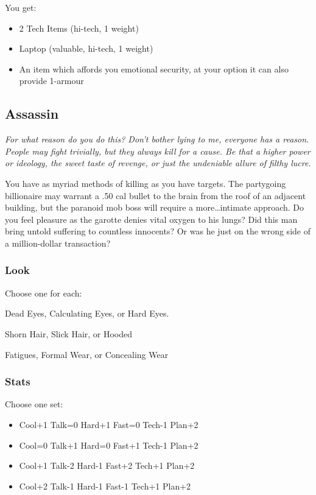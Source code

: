 You get:
\begin{itemize}
\item 2 Tech Items (hi-tech, 1 weight)
\item Laptop (valuable, hi-tech, 1 weight)
\item An item which affords you emotional security, at your option it can also provide 1-armour
\end{itemize}



\subsection{Assassin}
{\itshape For what reason do you do this? Don't bother lying to me, everyone has a reason. People may fight trivially, but they always kill for a cause. Be that a higher power or ideology, the sweet taste of revenge, or just the undeniable allure of filthy lucre.

You have as myriad methods of killing as you have targets. The partygoing billionaire may warrant a .50 cal bullet to the brain from the roof of an adjacent building, but the paranoid mob boss will require a more\ldots intimate approach. Do you feel pleasure as the garotte denies vital oxygen to his lungs? Did this man bring untold suffering to countless innocents? Or was he just on the wrong side of a million-dollar transaction?}

\subsubsection{Look}
Choose one for each:

Dead Eyes, Calculating Eyes, or Hard Eyes.

Shorn Hair, Slick Hair, or Hooded

Fatigues, Formal Wear, or Concealing Wear

\subsubsection{Stats}
Choose one set:
\begin{itemize}
\setlength\itemsep{0em}
\item Cool+1 Talk=0 Hard+1 Fast=0 Tech-1 Plan+2
\item Cool=0 Talk+1 Hard=0 Fast+1 Tech-1 Plan+2
\item Cool+1 Talk-2 Hard-1 Fast+2 Tech+1 Plan+2
\item Cool+2 Talk-1 Hard-1 Fast-1 Tech+1 Plan+2
\end{itemize}

